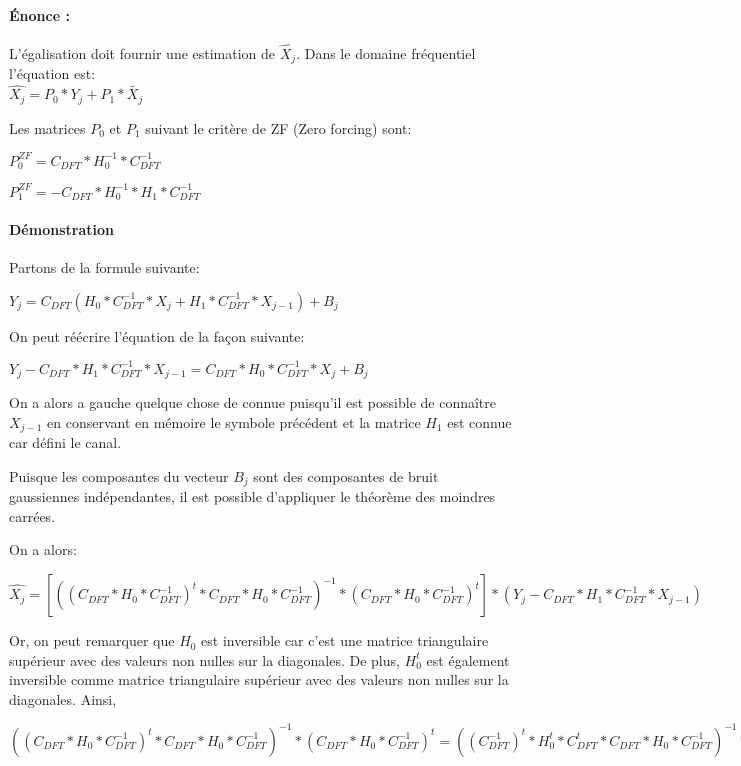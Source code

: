 \paragraph{Énonce :}


L'égalisation doit fournir une estimation de $\widehat{X_j}$. Dans le domaine
fréquentiel l'équation est:
~\\

$\widehat{X_j}= P_0*Y_j+P_1*\tilde{X_j}$

Les matrices $P_0$ et $P_1$ suivant le critère de ZF (Zero forcing) sont:

$P_0^{ZF} = C_{DFT}*H_0^{-1}*C_{DFT}^{-1}$

$P_1^{ZF} = - C_{DFT}*H_0^{-1}*H_1*C_{DFT}^{-1}$

\paragraph{Démonstration}


Partons de la formule suivante:

$ Y_j = C_{DFT}(H_0*C_{DFT}^{-1}*X_j + H_1*C_{DFT}^{-1}*X_{j-1}) + B_j$

On peut réécrire l'équation de la façon suivante:

$ Y_j - C_{DFT}*H_1*C_{DFT}^{-1}*X_{j-1}= C_{DFT}*H_0*C_{DFT}^{-1}*X_j + B_j$

On a alors a gauche quelque chose de connue puisqu'il est possible de connaître
$X_{j-1}$ en conservant en mémoire le symbole précédent et la matrice $H_1$ est
connue car défini le canal.

Puisque les composantes du vecteur $B_j$ sont des composantes de bruit
gaussiennes indépendantes, il est possible d'appliquer le théorème des moindres
carrées.

On a alors:

$\widehat{X_j}=[((C_{DFT}*H_0*C_{DFT}^{-1})^t*C_{DFT}*H_0*C_{DFT}^{-1})^{-1}*(C_{DFT}*H_0*C_{DFT}^{-1})^t]*(Y_j - C_{DFT}*H_1*C_{DFT}^{-1}*X_{j-1})$

Or, on peut remarquer que $H_0$ est inversible car c'est une matrice
triangulaire supérieur avec des valeurs non nulles sur la diagonales. De plus,
$H_0^t$ est également inversible comme matrice triangulaire supérieur avec des
valeurs non nulles sur la diagonales. Ainsi,

$((C_{DFT}*H_0*C_{DFT}^{-1})^t*C_{DFT}*H_0*C_{DFT}^{-1})^{-1}*(C_{DFT}*H_0*C_{DFT}^{-1})^t
=
((C_{DFT}^{-1})^t*H_0^t*C_{DFT}^{t}*C_{DFT}*H_0*C_{DFT}^{-1})^{-1}*(C_{DFT}^{-1})^t*H_0^t*C_{DFT}^{t}
=
(C_{DFT}*H_0^{-1}*C_{DFT}^{-1}*(C_{DFT}^t)^{-1}*(H_0^t)^{-1}*((C_{DFT}^{-1})^t)^{-1}*(C_{DFT}^{-1})^t*H_0^t*C_{DFT}^{t}
= C_{DFT}*H_0^{-1}*C_{DFT}^{-1}$

